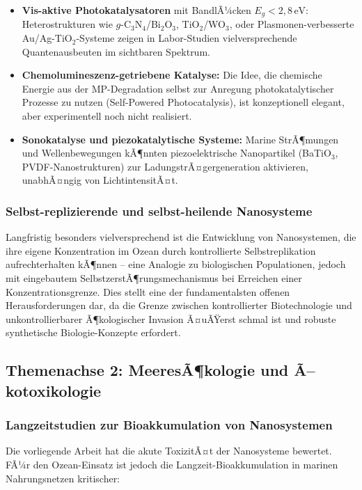 ﻿\documentclass[12pt,a4paper]{article}
\theoremstyle{definition}
\theoremstyle{remark}
\begin{document}
\begin{itemize}
  \item \textbf{Vis-aktive Photokatalysatoren} mit BandlÃ¼cken
        $E_g < 2{,}8\,\text{eV}$: Heterostrukturen wie
        $g\text{-C}_3\text{N}_4$/Bi$_2$O$_3$, TiO$_2$/WO$_3$,
        oder Plasmonen-verbesserte Au/Ag-TiO$_2$-Systeme zeigen
        in Labor-Studien vielversprechende Quantenausbeuten
        im sichtbaren Spektrum.
  \item \textbf{Chemolumineszenz-getriebene Katalyse:} Die Idee, die chemische
        Energie aus der MP-Degradation selbst zur Anregung photokatalytischer
        Prozesse zu nutzen (Self-Powered Photocatalysis), ist konzeptionell
        elegant, aber experimentell noch nicht realisiert.
  \item \textbf{Sonokatalyse und piezokatalytische Systeme:} Marine StrÃ¶mungen
        und Wellenbewegungen kÃ¶nnten piezoelektrische Nanopartikel
        (BaTiO$_3$, PVDF-Nanostrukturen) zur LadungstrÃ¤gergeneration aktivieren,
        unabhÃ¤ngig von LichtintensitÃ¤t.
\end{itemize}

\subsubsection{Selbst-replizierende und selbst-heilende Nanosysteme}

Langfristig besonders vielversprechend ist die Entwicklung von Nanosystemen,
die ihre eigene Konzentration im Ozean durch kontrollierte Selbstreplikation
aufrechterhalten kÃ¶nnen -- eine Analogie zu biologischen Populationen, jedoch
mit eingebautem SelbstzerstÃ¶rungsmechanismus bei Erreichen einer Konzentrationsgrenze.
Dies stellt eine der fundamentalsten offenen Herausforderungen dar, da die
Grenze zwischen kontrollierter Biotechnologie und unkontrollierbarer
Ã¶kologischer Invasion Ã¤uÃŸerst schmal ist und robuste synthetische Biologie-Konzepte
erfordert.

\subsection{Themenachse 2: MeeresÃ¶kologie und Ã–kotoxikologie}

\subsubsection{Langzeitstudien zur Bioakkumulation von Nanosystemen}

Die vorliegende Arbeit hat die akute ToxizitÃ¤t der Nanosysteme bewertet.
FÃ¼r den Ozean-Einsatz ist jedoch die Langzeit-Bioakkumulation in marinen
Nahrungsnetzen kritischer:
\end{document}
